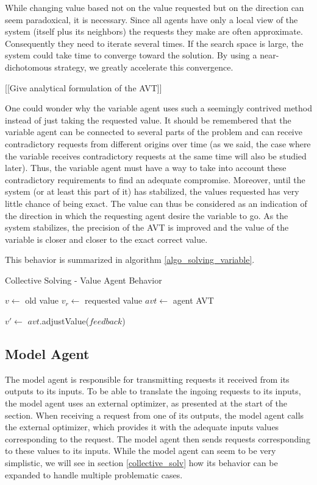 While changing value based not on the value requested but on the direction can seem paradoxical, it is necessary. Since all agents have only a local view of the system (itself plus its neighbors) the requests they make are often approximate. Consequently they need to iterate several times. If the search space is large, the system could take time to converge toward the solution. By using a near-dichotomous strategy, we greatly accelerate this convergence.

[[Give analytical formulation of the AVT]]

One could wonder why the variable agent uses such a seemingly contrived method instead of just taking the requested value. It should be remembered that the variable agent can be connected to several parts of the problem and can receive contradictory requests from different origins over time (as we said, the case where the variable receives contradictory requests at the same time will also be studied later). Thus, the variable agent must have a way to take into account these contradictory requirements to find an adequate compromise. Moreover, until the system (or at least this part of it) has stabilized, the values requested has very little chance of being exact. The value can thus be considered as an indication of the direction in which the requesting agent desire the variable to go. As the system stabilizes, the precision of the AVT is improved and the value of the variable is closer and closer to the exact correct value.

This behavior is summarized in algorithm \ref{algo_solving_variable}.

\begin{algorithm}
\caption{Collective Solving - Value Agent Behavior}
\label{algo_solving_variable}

	$v \leftarrow$ old value\;
	$v_r \leftarrow$ requested value\;
	$avt \leftarrow$ agent AVT \;
	
	$v' \leftarrow$ $avt$.adjustValue($feedback$)\;
	
\end{algorithm}

\subsection{Model Agent}\label{model_agent_solving}

The model agent is responsible for transmitting requests it received from its outputs to its inputs. To be able to translate the ingoing requests to its inputs, the model agent uses an external optimizer, as presented at the start of the section. When receiving a request from one of its outputs, the model agent calls the external optimizer, which provides it with the adequate inputs values corresponding to the request. The model agent then sends requests corresponding to these values to its inputs.
While the model agent can seem to be very simplistic, we will see in section \ref{collective_solv} how its 
behavior can be expanded to handle multiple problematic cases.

